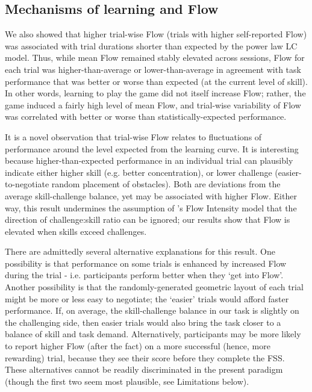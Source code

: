 \documentclass[a4paper,doc,floatsintext,natbib,10pt]{apa6}
\begin{document}
\subsection*{Mechanisms of learning and Flow}
We also showed that higher trial-wise Flow (trials with higher self-reported Flow) was associated with trial durations shorter than expected by the power law LC model. Thus, while mean Flow remained stably elevated across sessions, Flow for each trial was higher-than-average or lower-than-average in agreement with task performance that was better or worse than expected (at the current level of skill). In other words, learning to play the game did not itself increase Flow; rather, the game induced a fairly high level of mean Flow, and trial-wise variability of Flow was correlated with better or worse than statistically-expected performance.

It is a novel observation that trial-wise Flow relates to fluctuations of performance around the level expected from the learning curve. It is interesting because higher-than-expected performance in an individual trial can plausibly indicate either higher skill (e.g. better concentration), or lower challenge (easier-to-negotiate random placement of obstacles). Both are deviations from the average skill-challenge balance, yet may be associated with higher Flow. Either way, this result undermines the assumption of \cite{Keller2012}'s Flow Intensity model that the direction of challenge:skill ratio can be ignored; our results show that Flow is elevated when skills exceed challenges.

There are admittedly several alternative explanations for this result. One possibility is that performance on some trials is enhanced by increased Flow during the trial - i.e. participants perform better when they `get into Flow'. Another possibility is that the randomly-generated geometric layout of each trial might be more or less easy to negotiate; the `easier' trials would afford faster performance. If, on average, the skill-challenge balance in our task is slightly on the challenging side, then easier trials would also bring the task closer to a balance of skill and task demand. Alternatively, participants may be more likely to report higher Flow (after the fact) on a more successful (hence, more rewarding) trial, because they see their score before they complete the FSS. These alternatives cannot be readily discriminated in the present paradigm (though the first two seem most plausible, see Limitations below).
\end{document}
